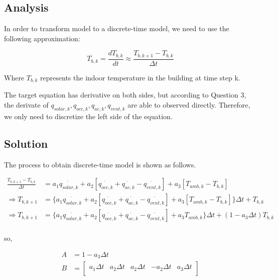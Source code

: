 \documentclass[titlepage,a4paper]{article}
\begin{document}
\fi

    \setlength{\parindent}{0pt}
    \setlength{\parskip}{0.5em}


    \subsection{Analysis}

    In order to transform model to a discrete-time model, we need to use the following approximation:

    \begin{equation}
        \dot{T_{b,k}} = \frac{dT_{b,k}}{dt} \approx \frac{T_{b,k+1}-T_{b,k}}{\Delta t}
    \end{equation}

    Where $T_{b,k}$ represents the indoor temperature in the building at time step k.

    The target equation has derivative on both sides, but according to Question 3, the derivate of $q_{solar,k}, q_{occ,k}, q_{ac,k}, q_{vent,k}$ are able to observed directly. Therefore, we only need to discretize the left side of the equation.

    \subsection{Solution} \label{solution.Q2}

    The process to obtain discrete-time model is shown as follows.

    \begin{equation}
        \begin{aligned}
            \frac{T_{b,k+1}-T_{b,k}}{\Delta t} &=a_1 \dot{q_{solar,k}}+a_2[\dot{q_{occ,k}}+\dot{q_{ac,k}}-\dot{q_{vent,k}}]+a_3[T_{amb,k}-T_{b,k}] \\
            \Rightarrow T_{b,k+1} &= \{a_1 \dot{q_{solar,k}}+a_2[\dot{q_{occ,k}}+\dot{q_{ac,k}}-\dot{q_{vent,k}}]+a_3[T_{amb,k}-T_{b,k}] \} \Delta t+T_{b,k} \\
            \Rightarrow T_{b,k+1} &= \{a_1 \dot{q_{solar,k}}+a_2[\dot{q_{occ,k}}+\dot{q_{ac,k}}-\dot{q_{vent,k}}]+a_3T_{amb,k}\} \Delta t +(1-a_3 \Delta t)T_{b,k} \\              
        \end{aligned}
    \end{equation}

    so,

    \begin{equation}
        \begin{aligned}
            A &=1-a_3 \Delta t \\
            B &=
            \begin{bmatrix}
                a_1 \Delta t & a_2 \Delta t & a_2 \Delta t & -a_2 \Delta t & a_3 \Delta t \\
            \end{bmatrix}
        \end{aligned}
    \end{equation}
    
\end{document}
